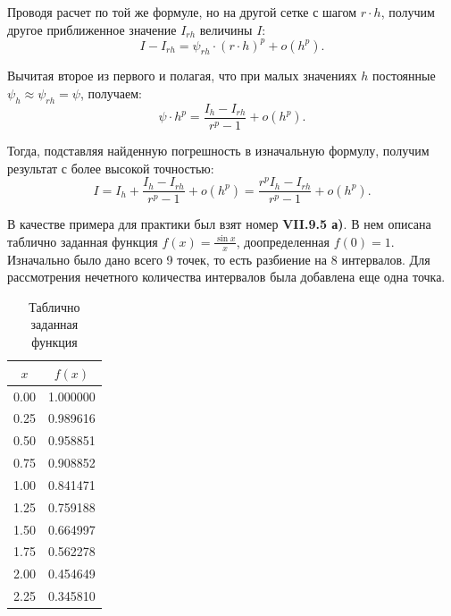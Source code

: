 		Проводя расчет по той же формуле, но на другой сетке с шагом $r \cdot h$, получим другое приближенное значение $I_{rh}$ величины $I$:
		\begin{equation*}
			I - I_{rh} = \psi_{rh} \cdot (r \cdot h)^p + o(h^p).
		\end{equation*}
	
		Вычитая второе из первого и полагая, что при малых значениях $h$ постоянные $\psi_h \approx \psi_{rh} = \psi$, получаем:
		\begin{equation*}
			\psi \cdot h^p = \frac{I_h - I_{rh}}{r^p - 1} + o(h^p).
		\end{equation*}
		
		Тогда, подставляя найденную погрешность в изначальную формулу, получим результат с более высокой точностью:
		\begin{equation}
			I = I_h + \frac{I_h - I_{rh}}{r^p - 1} + o(h^p) = \frac{r^p I_h - I_{rh}}{r^p - 1} + o(h^p).
		\end{equation}
	
		В качестве примера для практики был взят номер \textbf{VII.9.5 а)}. В нем описана таблично заданная функция $f(x) = \frac{\sin x}{x}$, доопределенная $f(0) = 1$. Изначально было дано всего 9 точек, то есть разбиение на 8 интервалов. Для рассмотрения нечетного количества интервалов была добавлена еще одна точка.

		\begin{table}[h!]
			\centering
			\begin{tabular}{|c|c|}
				\hline
				$x$  & $f(x)$   \\ \hline
				0.00 & 1.000000 \\ \hline
				0.25 & 0.989616 \\ \hline
				0.50 & 0.958851 \\ \hline
				0.75 & 0.908852 \\ \hline
				1.00 & 0.841471 \\ \hline
				1.25 & 0.759188 \\ \hline
				1.50 & 0.664997 \\ \hline
				1.75 & 0.562278 \\ \hline
				2.00 & 0.454649 \\ \hline \hline
				2.25 & 0.345810 \\ \hline
			\end{tabular}
			\caption{Таблично заданная функция}
		\end{table}
	
